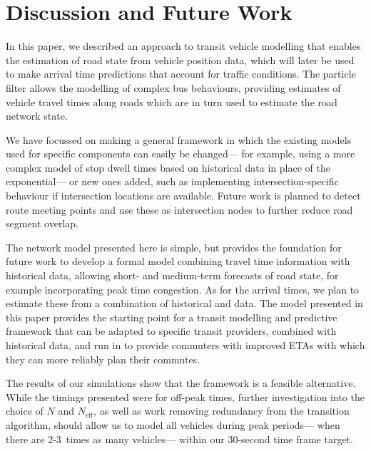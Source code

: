 \section{Discussion and Future Work}
\label{sec:discussion}

In this paper, we described an approach to transit vehicle modelling
that enables the \rt estimation of road state from vehicle position data,
which will later be used to make arrival time predictions
that account for \rt traffic conditions.
The particle filter allows the modelling of complex bus behaviours,
providing estimates of vehicle travel times along roads
which are in turn used to estimate the road network state.


We have focussed on making a general framework
in which the existing models used for specific components
can easily be changed---%
for example, using a more complex model of stop dwell times
based on historical data in place of the exponential---%
or new ones added, such as implementing intersection-specific behaviour
if intersection locations are available.
Future work is planned to detect route meeting points
and use these as intersection nodes
 to further reduce road segment overlap.


The network model presented here is simple, 
but provides the foundation for future work to
develop a formal model combining \rt travel time information with historical data, 
allowing short- and medium-term forecasts of road state,
for example incorporating peak time congestion.
As for the arrival times, 
we plan to estimate these from a combination of historical 
and \rt data.
The model presented in this paper provides the starting point
for a transit modelling and predictive framework
that can be adapted to specific transit providers,
combined with historical data,
and run in \rt to provide commuters with
improved ETAs with which they can more reliably
plan their commutes.


The results of our simulations show that the framework is a 
feasible \rt alternative.
While the timings presented were for off-peak times,
further investigation into the choice of $N$ and $N_\text{eff}$,
as well as work removing redundancy from the transition algorithm,
should allow us to model all vehicles during peak periods---%
when there are 2-3~times as many vehicles---%
within our 30-second time frame target.
